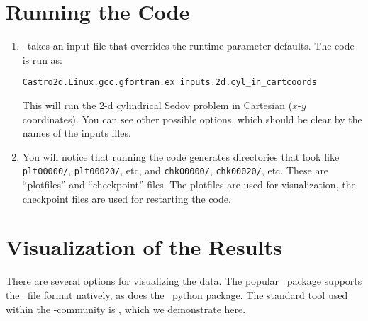 \section{Running the Code}

\begin{enumerate}

\item \castro\ takes an input file that overrides the runtime parameter defaults.
  The code is run as:
\begin{verbatim}
Castro2d.Linux.gcc.gfortran.ex inputs.2d.cyl_in_cartcoords
\end{verbatim}

This will run the 2-d cylindrical Sedov problem in Cartesian ($x$-$y$
coordinates).  You can see other possible options, which should be
clear by the names of the inputs files.

\item You will notice that running the code generates directories that
  look like {\tt plt00000/}, {\tt plt00020/}, etc, and {\tt chk00000/},
  {\tt chk00020/}, etc. These are ``plotfiles'' and ``checkpoint''
  files. The plotfiles are used for visualization, the checkpoint
  files are used for restarting the code.

\end{enumerate}

\section{Visualization of the Results}

There are several options for visualizing the data.  The popular
\visit\ package supports the \boxlib\ file format natively, as does
the \yt\ python package.  The standard tool used within the
\boxlib-community is \amrvis, which we demonstrate here.


